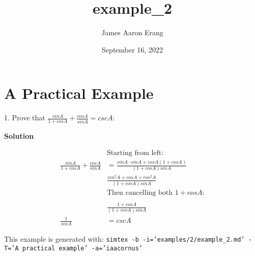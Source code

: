 \documentclass[12pt, UTF8]{article}
\title{example\_2}
\author{James Aaron Erang}
\date{September 16, 2022}
\begin{document}
	\maketitle
	
	\section*{A Practical Example}
	
	1. Prove that $\frac{sin A}{1 + cos A} + \frac{cos A}{sin A} = csc A$:
	
	\textbf{Solution}
	
	\begin{align}
		&\text{Starting from left:}  \nonumber \nonumber \\
		\frac{sin A}{1 + cos A} + \frac{cos A}{sin A} &= \frac{sin A \cdot sin A + cos A (1 + cos A)}{(1 + cos A) sin A} \\
		&\frac{sin^2 A + cos A + cos^2 A}{(1 + cos A) sin A} \\ 
		&\text{Then cancelling both $1 + cos A$:} \\ \nonumber \\
		&\frac{1 + cos A}{(1 + cos A) sin A} \\ 
		\frac{1}{sin A} &= csc A 
	\end{align}
	
	This example is generated with: \texttt{simtex -b -i='examples/2/example\_2.md'  -T='A practical example' -a='iaacornus'}
\end{document}
